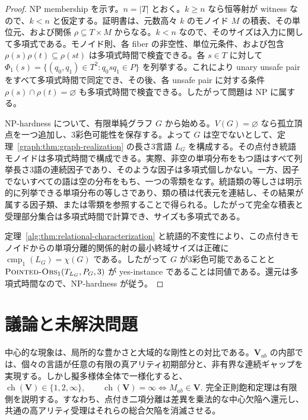 \documentclass[10pt,a4paper]{ltjsarticle}
\theoremstyle{definition}
\theoremstyle{remark}
\newcommand{\cmp}{\operatorname{cmp}}
\begin{document}
\begin{proof}
NP membership を示す。$n=|T|$ とおく。$k\ge n$ なら恒等射が witness なので、$k<n$ と仮定する。証明書は、元数高々 $k$ のモノイド $M$ の積表、その単位元、および関係
\(\rho\subseteq T\times M\)
からなる。$k<n$ なので、そのサイズは入力に関して多項式である。モノイド則、各 fiber の非空性、単位元条件、および包含
\(\rho(s)\rho(t)\subseteq\rho(st)\)
は多項式時間で検査できる。各 $s\in T$ に対して
\(\Phi_1(s)=\{(q_0,q_1)\in T^2:q_0sq_1\in P\}\)
を列挙する。これにより unary unsafe pair をすべて多項式時間で同定でき、その後、各 unsafe pair に対する条件
\(\rho(s)\cap\rho(t)=\varnothing\)
も多項式時間で検査できる。したがって問題は NP に属する。

NP-hardness について、有限単純グラフ $G$ から始める。$V(G)=\varnothing$ なら孤立頂点を一つ追加し、3彩色可能性を保存する。よって $G$ は空でないとして、定理~\ref{graph:thm:graph-realization} の長さ3言語 $L_G$ を構成する。その点付き統語モノイドは多項式時間で構成できる。実際、非空の単項分布をもつ語はすべて列挙長さ3語の連続因子であり、そのような因子は多項式個しかない。一方、因子でないすべての語は空の分布をもち、一つの零類をなす。統語類の等しさは明示的に列挙できる単項分布の等しさであり、類の積は代表元を連結し、その結果が属する因子類、または零類を参照することで得られる。したがって完全な積表と受理部分集合は多項式時間で計算でき、サイズも多項式である。

定理~\ref{alg:thm:relational-characterization} と統語的不変性により、この点付きモノイドからの単項分離的関係的射の最小終域サイズは正確に
\(\cmp_1(L_G)=\chi(G)\)
である。したがって $G$ が3彩色可能であることと
\({\normalfont\textsc{Pointed-Obs}}_1(T_{L_G},P_G,3)\)
が yes-instance であることは同値である。還元は多項式時間なので、NP-hardness が従う。
\end{proof}


\section{議論と未解決問題}
\label{sec:discussion}

中心的な現象は、局所的な豊かさと大域的な剛性との対比である。\(\mathbf V_{ab}\) の内部では、個々の言語が任意の有限の真アリティ初期部分と、非有界な連続ギャップを実現する。しかし擬多様体全体で一様化すると、
\(
\operatorname{ch}(\mathbf V)\in\{1,2,\infty\},
\qquad
\operatorname{ch}(\mathbf V)=\infty \Longleftrightarrow M_{ab}\in\mathbf V.
\)
完全正則飽和定理は有限側を説明する。すなわち、点付き二項分離は差異を乗法的な中心欠陥へ還元し、共通の高アリティ受理はそれらの総合欠陥を消滅させる。
\end{document}
